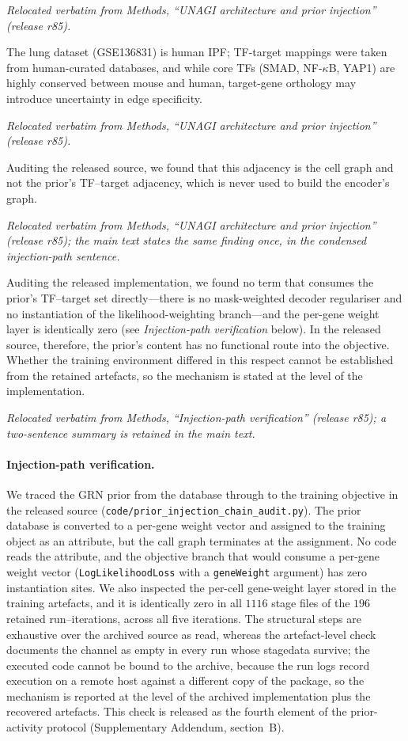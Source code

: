 \documentclass[11 pt,a4 paper]{article}
\begin{document}
\noindent\emph{Relocated verbatim from Methods, ``UNAGI architecture and prior injection'' (release r85).}

The lung dataset (GSE136831) is human IPF; TF-target mappings were taken from human-curated databases, and while core TFs (SMAD, NF-$\kappa$B, YAP1) are highly conserved between mouse and human, target-gene orthology may introduce uncertainty in edge specificity.

\noindent\emph{Relocated verbatim from Methods, ``UNAGI architecture and prior injection'' (release r85).}

Auditing the released source, we found that this adjacency is the cell graph and not the prior's TF--target adjacency, which is never used to build the encoder's graph.

\noindent\emph{Relocated verbatim from Methods, ``UNAGI architecture and prior injection'' (release r85); the main text states the same finding once, in the condensed injection-path sentence.}

Auditing the released implementation, we found no term that consumes the prior's TF--target set directly---there is no mask-weighted decoder regulariser and no instantiation of the likelihood-weighting branch---and the per-gene weight layer is identically zero (see \emph{Injection-path verification} below). In the released source, therefore, the prior's content has no functional route into the objective. Whether the training environment differed in this respect cannot be established from the retained artefacts, so the mechanism is stated at the level of the implementation.

\noindent\emph{Relocated verbatim from Methods, ``Injection-path verification'' (release r85); a two-sentence summary is retained in the main text.}

\paragraph*{Injection-path verification.} We traced the GRN prior from the database through to the training objective in the released source (\texttt{code/prior\_injection\_chain\_audit.py}). The prior database is converted to a per-gene weight vector and assigned to the training object as an attribute, but the call graph terminates at the assignment. No code reads the attribute, and the objective branch that would consume a per-gene weight vector (\texttt{LogLikelihoodLoss} with a \texttt{geneWeight} argument) has zero instantiation sites. We also inspected the per-cell gene-weight layer stored in the training artefacts, and it is identically zero in all $1116$ stage files of the $196$ retained run--iterations, across all five iterations. The structural steps are exhaustive over the archived source as read, whereas the artefact-level check documents the channel as empty in every run whose stagedata survive; the executed code cannot be bound to the archive, because the run logs record execution on a remote host against a different copy of the package, so the mechanism is reported at the level of the archived implementation plus the recovered artefacts. This check is released as the fourth element of the prior-activity protocol (Supplementary Addendum, section~B).
\end{document}
